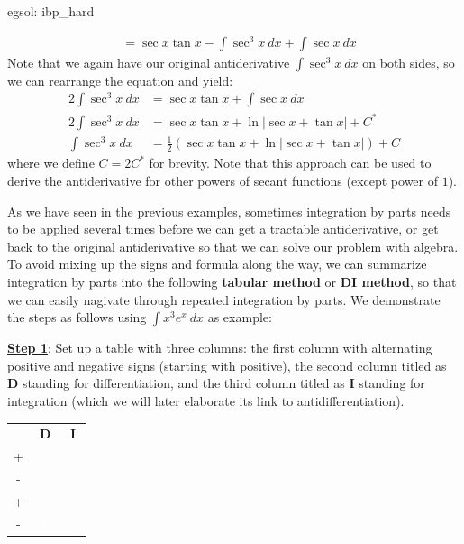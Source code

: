 \begin{egsol}[]{egsol: ibp_hard}
\begin{enumerate}[a)]
\begin{align*}
            &= \sec x \tan x - \int \sec^3 x~dx + \int \sec x~dx
        \end{align*}
        Note that we again have our original antiderivative $\int \sec^3 x~dx$ on both sides, so we can rearrange the equation and yield:
        \begin{align*}
            2\int \sec^3 x~dx &= \sec x \tan x + \int \sec x~dx\\
            2\int \sec^3 x~dx &= \sec x \tan x + \ln |\sec x + \tan x| + C^*\\
            \int \sec^3 x~dx &= \frac{1}{2}(\sec x \tan x + \ln |\sec x + \tan x|) + C
        \end{align*}
        where we define $C = 2C^*$ for brevity.  Note that this approach can be used to derive the antiderivative for other powers of secant functions (except power of $1$).
    \end{enumerate}
\end{egsol}

As we have seen in the previous examples, sometimes integration by parts needs to be applied several times before we can get a tractable antiderivative, or get back to the original antiderivative so that we can solve our problem with algebra.  To avoid mixing up the signs and formula along the way, we can summarize integration by parts into the following \textbf{tabular method} or \textbf{DI method}, so that we can easily nagivate through repeated integration by parts.  We demonstrate the steps as follows using $\int x^3e^x~dx$ as example: 

\underline{\textbf{Step 1}}: Set up a table with three columns: the first column with alternating positive and negative signs (starting with positive), the second column titled as \textbf{D} standing for differentiation, and the third column titled as \textbf{I} standing for integration (which we will later elaborate its link to antidifferentiation).

\begin{table}[hbt!]
    \centering
    \begin{tabular}{ccc}
         & \textbf{D} & \textbf{I} \\
        + & \textcolor{white}{$x^3$} & \textcolor{white}{$e^x$}\\
        - & \textcolor{white}{$3x^2$} & \textcolor{white}{$e^x$}\\
        + & \textcolor{white}{$6x$} & \textcolor{white}{$e^x$}\\
        - & \textcolor{white}{$6$} & \textcolor{white}{$e^x$}\\
    \end{tabular}
\end{table}

